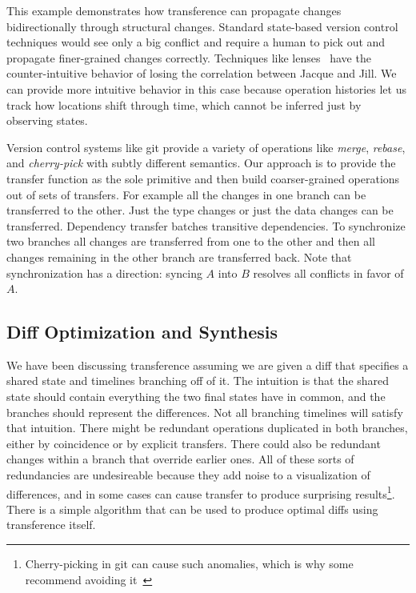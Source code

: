 \documentclass[english,submission]{programming}
\theoremstyle{definition}
\begin{document}
This example demonstrates how transference can propagate changes bidirectionally through structural changes. Standard state-based version control techniques would see only a big conflict and require a human to pick out and propagate finer-grained changes correctly.
Techniques like lenses~\cite{Foster2007} have the counter-intuitive behavior of losing the correlation between Jacque and Jill. We can provide more intuitive behavior in this case because operation histories let us track how locations shift through time, which cannot be inferred just by observing states.

Version control systems like git provide a variety of operations like \textit{merge}, \textit{rebase}, and \textit{cherry-pick} with subtly different semantics. Our approach is to provide the transfer function as the sole primitive and then build coarser-grained operations out of sets of transfers. For example all the changes in one branch can be transferred to the other. Just the type changes or just the data changes can be transferred. Dependency transfer batches transitive dependencies. To synchronize two branches all changes are transferred from one to the other and then all changes remaining in the other branch are transferred back. Note that synchronization has a direction: syncing $A$ into $B$ resolves all conflicts in favor of $A$.


\subsection{Diff Optimization and Synthesis}\label{diff-synth}

We have been discussing transference assuming we are given a diff that specifies a shared state and timelines branching off of it. The intuition is that the shared state should contain everything the two final states have in common, and the branches should represent the differences. Not all branching timelines will satisfy that intuition. There might be redundant operations duplicated in both branches, either by coincidence or by explicit transfers. There could also be redundant changes within a branch that override earlier ones. All of these sorts of redundancies are undesireable because they add noise to a visualization of differences, and in some cases can cause transfer to produce surprising results\footnote{Cherry-picking in git can cause such anomalies, which is why some recommend avoiding it~\cite{philomatics-git}}. There is a simple algorithm that can be used to produce optimal diffs using transference itself.
\end{document}
